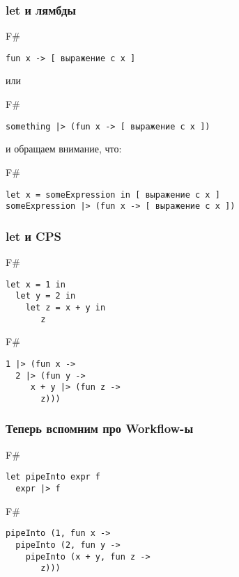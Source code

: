 \documentclass[xetex,mathserif,serif]{beamer}
\begin{document}
	\begin{frame}[fragile]
		\frametitle{let и лямбды}
		\begin{exampleblock}{F\#}
			\begin{verbatim}
fun x -> [ выражение c x ]
			\end{verbatim}
		\end{exampleblock}
		или
		\begin{exampleblock}{F\#}
			\begin{verbatim}
something |> (fun x -> [ выражение c x ])
			\end{verbatim}
		\end{exampleblock}
		и обращаем внимание, что:
		\begin{exampleblock}{F\#}
			\begin{verbatim}
let x = someExpression in [ выражение c x ]
someExpression |> (fun x -> [ выражение c x ])
			\end{verbatim}
		\end{exampleblock}
\end{frame}

	\begin{frame}[fragile]
		\frametitle{let и CPS}
		\begin{exampleblock}{F\#}
			\begin{verbatim}
let x = 1 in
  let y = 2 in
    let z = x + y in
       z
			\end{verbatim}
		\end{exampleblock}
		\begin{exampleblock}{F\#}
			\begin{verbatim}
1 |> (fun x ->
  2 |> (fun y -> 
     x + y |> (fun z -> 
       z)))
			\end{verbatim}
		\end{exampleblock}
\end{frame}

	\begin{frame}[fragile]
		\frametitle{Теперь вспомним про Workflow-ы}
		\begin{exampleblock}{F\#}
			\begin{verbatim}
let pipeInto expr f
  expr |> f
			\end{verbatim}
		\end{exampleblock}
		\begin{exampleblock}{F\#}
			\begin{verbatim}
pipeInto (1, fun x ->
  pipeInto (2, fun y -> 
    pipeInto (x + y, fun z -> 
       z)))
			\end{verbatim}
		\end{exampleblock}
\end{frame}
\end{document}
